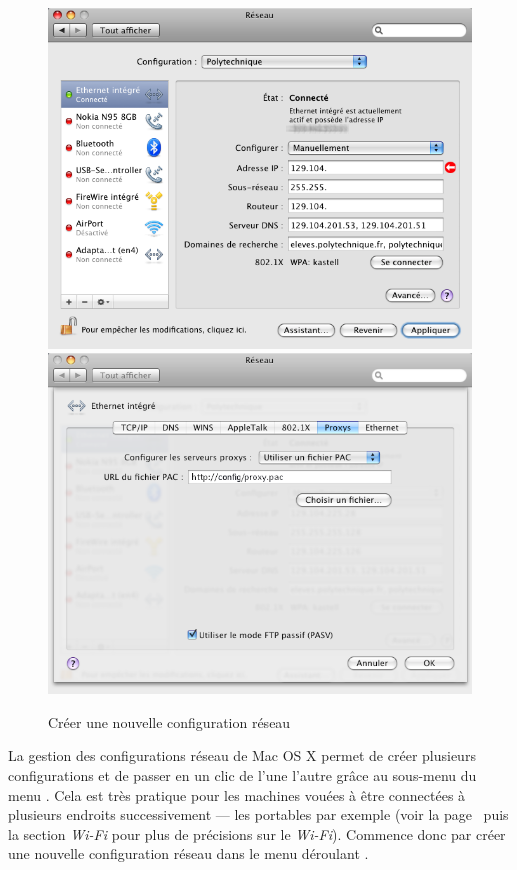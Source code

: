 \begin{figure}[h]
\begin{center}
{\begin{minipage}{0.43 \textwidth}
\begin{flushright}
 		{\includegraphics[width=0.96 \textwidth]{images/mac_config_ip_leopard}} \\
 		{\includegraphics[width=0.96 \textwidth]{images/mac_config_proxy_leopard}}
\end{flushright}
 		\end{minipage}
 		 	\label{config:mac:ip:leopard}	}
     	 \caption{Cr\'eer une nouvelle configuration r\'eseau}

    \end{center}
  \end{figure}

\pagebreak

La gestion des configurations r\'eseau de Mac OS X permet de cr\'eer plusieurs configurations et de passer en un clic de l'une  l'autre gr\^ace au sous-menu  du menu . Cela est tr\`es pratique pour les machines vou\'ees \`a  \^etre connect\'ees \`a  plusieurs endroits successivement --- les portables par exemple (voir la page~\pageref{wifi} puis la section \emph{Wi-Fi} pour plus de pr\'ecisions sur le \emph{Wi-Fi}). Commence donc par cr\'eer une nouvelle configuration r\'eseau dans le menu d\'eroulant .



